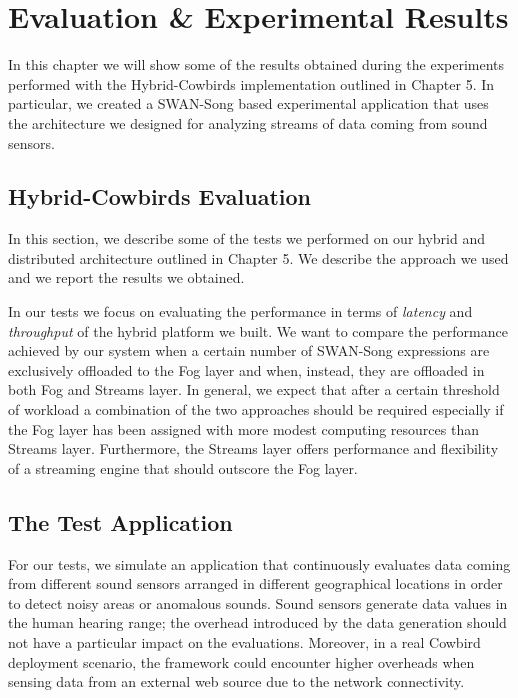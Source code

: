 \chapter{Evaluation \& Experimental Results}
In this chapter we will show some of the results obtained during the experiments performed with the Hybrid-Cowbirds implementation outlined in Chapter 5. In particular, we created a SWAN-Song based experimental application that uses the architecture we designed for analyzing streams of data coming from sound sensors.

\section{Hybrid-Cowbirds Evaluation}
In this section, we describe some of the tests we performed on our hybrid and distributed architecture outlined in Chapter 5. We describe the approach we used and we report the results we obtained.

In our tests we focus on evaluating the performance in terms of \emph{latency} and \emph{throughput} of the hybrid platform we built. We want to compare the performance achieved by our system when a certain number of SWAN-Song expressions are exclusively offloaded to the Fog layer and when, instead, they are offloaded in both Fog and Streams layer. In general, we expect that after a certain threshold of workload a combination of the two approaches should be required especially if the Fog layer has been assigned with more modest computing resources than Streams layer. Furthermore, the Streams layer offers performance and flexibility of a streaming engine that should outscore the Fog layer.

\section{The Test Application}
For our tests, we simulate an application that continuously evaluates data coming from different sound sensors arranged in different geographical locations in order to detect noisy areas or anomalous sounds. Sound sensors generate data values in the human hearing range; the overhead introduced by the data generation should not have a particular impact on the evaluations. Moreover, in a real Cowbird deployment scenario, the framework could encounter higher overheads when sensing data from an external web source due to the network connectivity.

